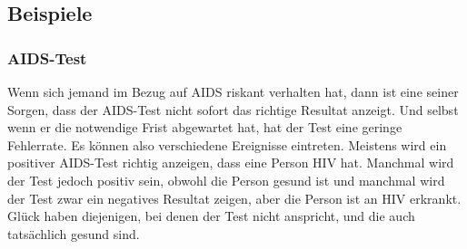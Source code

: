 \subsection{Beispiele}
\subsubsection{AIDS-Test}
Wenn sich jemand im Bezug auf AIDS riskant verhalten hat, dann ist
eine seiner Sorgen, dass der AIDS-Test nicht sofort das richtige
Resultat anzeigt.
Und selbst wenn er die notwendige Frist abgewartet
hat, hat der Test eine geringe Fehlerrate.
Es können also verschiedene Ereignisse eintreten.
Meistens wird ein
positiver AIDS-Test richtig anzeigen, dass eine Person HIV hat.
Manchmal
wird der Test jedoch positiv sein, obwohl die Person gesund ist
und manchmal wird der Test zwar ein negatives Resultat zeigen,
aber die Person ist an HIV erkrankt.
Glück haben diejenigen, bei denen der Test nicht
anspricht, und die auch tatsächlich gesund sind.


